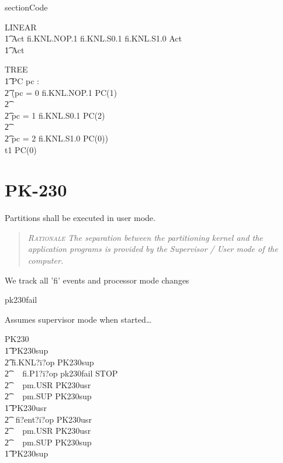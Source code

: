 section{Code}

\begin{circus}
\circprocess LINEAR \circdef \circbegin
\\ \t1 Act \circdef fi.KNL.NOP.1 \then
   fi.KNL.S0.1  \then
   fi.KNL.S1.0  \then Act
\\ \t1 \circspot Act
\\ \circend
\end{circus}
\begin{circus}
\circprocess TREE \circdef \circbegin
\\ \t1 PC \circdef pc : \nat \circspot
\\ \t2 (\lcircguard pc = 0 \rcircguard \circguard fi.KNL.NOP.1 \then PC(1)
\\ \t2 \extchoice
\\ \t2 \lcircguard pc = 1 \rcircguard \circguard fi.KNL.S0.1  \then PC(2)
\\ \t2 \extchoice
\\ \t2 \lcircguard pc = 2 \rcircguard \circguard fi.KNL.S1.0  \then PC(0))
\\ t1 \circspot PC(0)
\\\circend
\end{circus}

\section{PK-230}

Partitions shall be executed in user mode.
\begin{quote}\it
\textsc{Rationale}
The separation between the partitioning kernel and the application programs
is provided by the Supervisor / User mode of the computer.
\end{quote}

We track all 'fi' events and processor mode changes

\begin{circus}
\circchannel pk230fail
\end{circus}

Assumes supervisor mode when started\dots
\begin{circus}
\circprocess PK230 \circdef \circbegin
\\ \t1 PK230sup \circdef
\\ \t2 fi.KNL?i?op \then PK230sup
\\ \t2 ~\extchoice~ fi.P1?i?op \then pk230fail \then STOP
\\ \t2 ~\extchoice~ pm.USR \then PK230usr
\\ \t2 ~\extchoice~ pm.SUP \then PK230sup
\\ \t1 PK230usr \circdef
\\ \t2 ~fi?ent?i?op \then PK230usr
\\ \t2 ~\extchoice~ pm.USR \then PK230usr
\\ \t2 ~\extchoice~ pm.SUP \then PK230sup
\\ \t1 \circspot PK230sup
\\ \circend
\end{circus}

